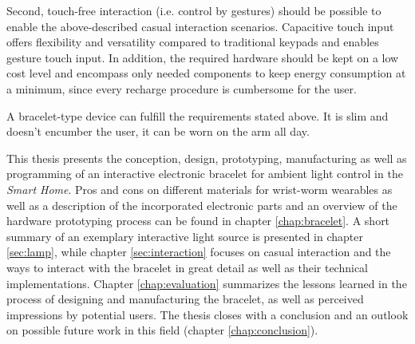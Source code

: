 Second, touch-free interaction (i.e. control by gestures) should be possible to enable the above-described casual interaction scenarios. Capacitive touch input offers flexibility and versatility compared to traditional keypads and enables gesture touch input. In addition, the required hardware should be kept on a low cost level and encompass only needed components to keep energy consumption at a minimum, since every recharge procedure is cumbersome for the user.

A bracelet-type device can fulfill the requirements stated above. It is slim and doesn't encumber the user, it can be worn on the arm all day.

This thesis presents the conception, design, prototyping, manufacturing as well as programming of an interactive electronic bracelet for ambient light control in the \textit{Smart Home}. Pros and cons on different materials for wrist-worm wearables as well as a description of the incorporated electronic parts and an overview of the hardware prototyping process can be found in chapter \ref{chap:bracelet}. A short summary of an exemplary interactive light source is presented in chapter \ref{sec:lamp}, while chapter \ref{sec:interaction} focuses on casual interaction and the ways to interact with the bracelet in great detail as well as their technical implementations. Chapter \ref{chap:evaluation} summarizes the lessons learned in the process of designing and manufacturing the bracelet, as well as perceived impressions by potential users. The thesis closes with a conclusion and an outlook on possible future work in this field (chapter \ref{chap:conclusion}).